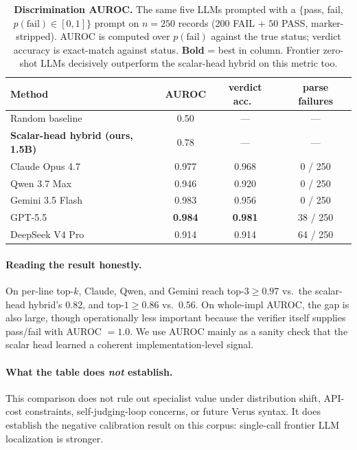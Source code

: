 \documentclass[10pt]{article}
\begin{document}
\begin{table}[t]
\centering
\small
\caption{\textbf{Discrimination AUROC.} The same five LLMs prompted
with a $\{$pass, fail, $p(\text{fail}) \in [0,1]\}$ prompt on
$n=250$ records ($200$ FAIL + $50$ PASS, marker-stripped). AUROC is
computed over $p(\text{fail})$ against the true status; verdict
accuracy is exact-match against status. \textbf{Bold} = best in
column. Frontier zero-shot LLMs decisively outperform the scalar-head hybrid on
this metric too.}
\label{tab:llm-discrimination}
\begin{tabular}{lccc}
\toprule
Method & AUROC & verdict acc.\ & parse failures \\
\midrule
Random baseline                                 & 0.50           & ---            & --- \\
\textbf{Scalar-head hybrid (ours, 1.5B)}                  & 0.78           & ---            & --- \\
Claude Opus 4.7~\cite{anthropic2026claude47}    & 0.977          & 0.968          & 0 / 250 \\
Qwen 3.7 Max~\cite{qwen2026qwen37}              & 0.946          & 0.920          & 0 / 250 \\
Gemini 3.5 Flash~\cite{google2026gemini35}      & 0.983          & 0.956          & 0 / 250 \\
GPT-5.5~\cite{openai2026gpt55}                  & \textbf{0.984} & \textbf{0.981} & 38 / 250 \\
DeepSeek V4 Pro~\cite{deepseek2026v4}           & 0.914          & 0.914          & 64 / 250 \\
\bottomrule
\end{tabular}
\end{table}

\paragraph{Reading the result honestly.}
On per-line top-$k$, Claude, Qwen, and Gemini reach top-$3 \ge 0.97$
vs.\ the scalar-head hybrid's $0.82$, and top-$1 \ge 0.86$ vs.\ $0.56$.
On whole-impl AUROC, the gap is also large, though operationally less
important because the verifier itself supplies pass/fail with AUROC
$=1.0$. We use AUROC mainly as a sanity check that the scalar head
learned a coherent implementation-level signal.

\paragraph{What the table does \emph{not} establish.}
This comparison does not rule out specialist value under distribution
shift, API-cost constraints, self-judging-loop concerns, or future Verus
syntax. It does establish the negative calibration result on this corpus:
single-call frontier LLM localization is stronger.
\end{document}
